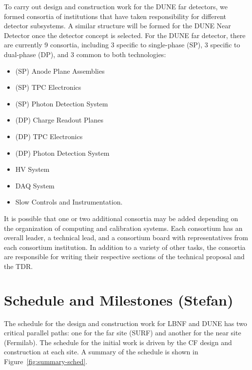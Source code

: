 To carry out design and construction work for the DUNE far detectors, we formed consortia of institutions that have taken responsibility for different detector subsystems. A similar structure will be formed for the DUNE Near Detector once the detector concept is selected. For the DUNE far detector, there are currently 9 consortia, including 3 specific to single-phase (SP), 3 specific to dual-phase (DP), and 3 common to both technologies:
\begin{itemize}
\item (SP) Anode Plane Assemblies%
\item (SP) TPC Electronics%
\item (SP) Photon Detection System%
\item (DP) Charge Readout Planes%
\item (DP) TPC Electronics %
\item (DP) Photon Detection System %
\item HV System %
\item DAQ System %
\item Slow Controls and Instrumentation. %
\end{itemize}
It is possible that one or two additional consortia may be added depending on the organization of computing and calibration systems. Each consortium has an overall leader, a technical lead, and a consortium board with representatives from each consortium institution. In addition to a variety of other tasks, the consortia are responsible for writing their respective sections of the technical proposal and the TDR.


\section{Schedule and Milestones (Stefan)} %

The schedule for the design and construction work for LBNF and DUNE has two critical parallel paths: one for the %
far site (SURF) and %
another for the %
near site (Fermilab). The schedule for the initial work is driven by the CF design and construction at each site. A summary of the schedule is shown in Figure~\ref{fig:summary-sched}.

